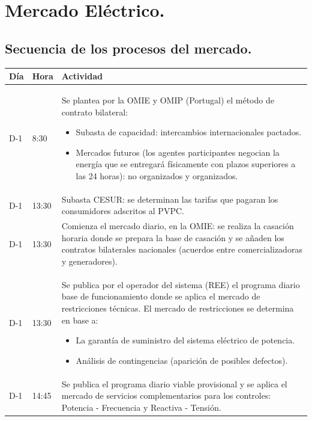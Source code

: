 \section{Mercado Eléctrico.}
\subsection{Secuencia de los procesos del mercado.}
\begin{table}[H]
	\centering
	\renewcommand{\arraystretch}{1.5}
	\begin{tabular}{p{2cm}|p{2cm}|p{8cm}}
		\hline
		Día & Hora & Actividad \\
		\hline
		D-1 & 8:30 & Se plantea por la OMIE y OMIP (Portugal) el método de contrato bilateral:
		\begin{itemize}
			\item Subasta de capacidad: intercambios internacionales pactados.
			\item Mercados futuros (los agentes participantes negocian la energía que se entregará físicamente con plazos superiores a las 24 horas): no organizados y organizados.
		\end{itemize} \\\hline
		D-1 & 13:30& Subasta CESUR: se determinan las tarifas que pagaran los consumidores adscritos al PVPC.  \\\hline
		D-1 & 13:30 & Comienza el mercado diario, en la OMIE: se realiza la casación horaria donde se prepara la base de casación y se añaden los contratos bilaterales nacionales (acuerdos entre comercializadoras y generadores). \\\hline
		D-1 & 13:30 &  Se publica por el operador del sistema (REE) el programa diario base de funcionamiento donde se aplica el mercado de restricciones técnicas. El mercado de restricciones se determina en base a:
		\begin{itemize}
			\item La garantía de suministro del sistema eléctrico de potencia.
			\item Análisis de contingencias (aparición de posibles defectos).
		\end{itemize}\\\hline
		D-1 & 14:45 & Se publica el programa diario viable provisional y se aplica el mercado de servicios complementarios para los controles: Potencia - Frecuencia y Reactiva - Tensión. 
		

\end{tabular}
\end{table}
